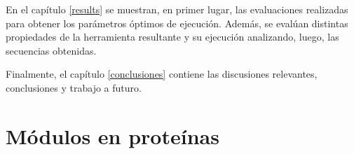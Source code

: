 En el capítulo \ref{results} se muestran, en primer lugar, las evaluaciones realizadas para obtener los parámetros óptimos de ejecución. 
Además, se evalúan distintas propiedades de la herramienta resultante y su ejecución analizando, luego, las secuencias obtenidas. 

Finalmente, el capítulo \ref{conclusiones} contiene las discusiones relevantes, conclusiones y trabajo a futuro.






\section{Módulos en proteínas}
\label{proteinLandscape}
% 

